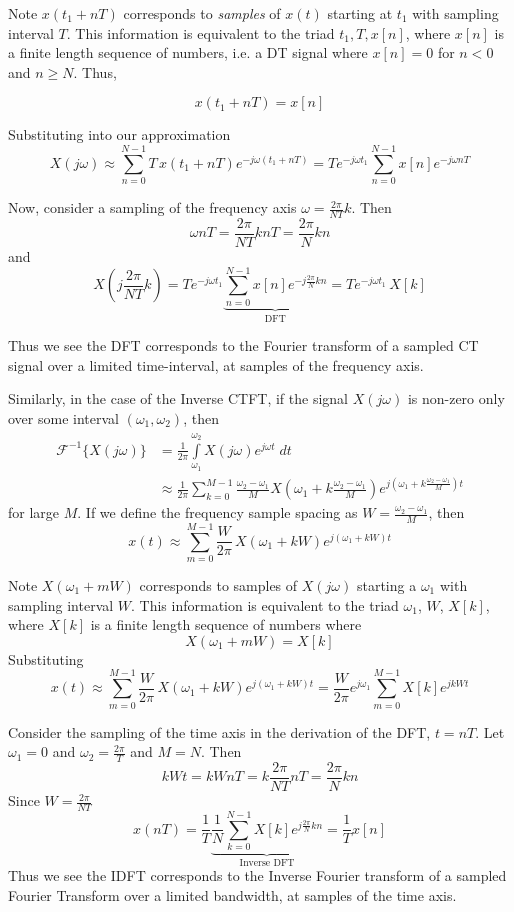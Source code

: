 Note $x\left(t_1 + nT\right)$ corresponds to \emph{samples} of $x(t)$ starting at $t_1$ with sampling interval $T$. This information is equivalent to the triad $t_1, T, x[n]$, where $x[n]$ is a finite length sequence of numbers, i.e. a DT signal where $x[n] = 0$ for $n < 0$ and $n \geq N$. Thus,

\[
x\left(t_1 + nT\right) = x[n]
\]

Substituting into our approximation
\[
X(j\omega) \approx \sum_{n = 0}^{N-1} T \, x\left(t_1 + nT\right) e^{-j\omega \left(t_1 + nT\right)} = T e^{-j\omega t_1} \sum_{n = 0}^{N-1} x[n] e^{-j\omega n T} 
\]

Now, consider a sampling of the frequency axis $\omega = \frac{2\pi}{NT} k$. Then
\[
\omega n T = \frac{2\pi}{N T} k n T = \frac{2\pi}{N}k n
\]
and
\[
X\left(j\frac{2\pi}{NT} k\right) = T e^{-j\omega t_1} \underbrace{\sum_{n = 0}^{N-1} x[n]  e^{-j \frac{2\pi}{N}k n}}_{\text{DFT}} = T e^{-j\omega t_1} \, X[k] 
\]

Thus we see the DFT corresponds to the Fourier transform of a sampled CT signal over a limited time-interval, at samples of the frequency axis.

Similarly, in the case of the Inverse CTFT, if the signal $X(j\omega)$ is non-zero only over some interval $(\omega_1, \omega_2)$, then
\begin{align*}
  \mathcal{F}^{-1}\{ X(j\omega) \} &= \frac{1}{2\pi} \int\limits_{\omega_1}^{\omega_2} X(j\omega) e^{j\omega t} \; dt\\ &\approx \frac{1}{2\pi} \sum_{k = 0}^{M-1} \frac{\omega_2-\omega_1}{M} X\left(\omega_1 + k\frac{\omega_2-\omega_1}{M}\right) e^{j \left(\omega_1 + k\frac{\omega_2-\omega_1}{M}\right)t} 
\end{align*}
for large $M$. If we define the frequency sample spacing as $W = \frac{\omega_2-\omega_1}{M}$, then
\[
x(t) \approx \sum_{m = 0}^{M-1} \frac{W}{2\pi}  \, X\left(\omega_1 + kW\right) e^{j\left(\omega_1 + kW\right)t}
\]

Note $X\left(\omega_1 + mW\right)$ corresponds to samples of $X(j\omega)$ starting a $\omega_1$ with sampling interval $W$. This information is equivalent to the triad $\omega_1$, $W$, $X[k]$, where $X[k]$ is a finite length sequence of numbers where 
\[
X\left(\omega_1 + mW\right) = X[k]
\]
Substituting 
\[
x(t) \approx \sum_{m = 0}^{M-1} \frac{W}{2\pi}  \, X\left(\omega_1 + kW\right) e^{j\left(\omega_1 + kW\right)t} = \frac{W}{2\pi} e^{j\omega_1} \sum_{m = 0}^{M-1}  X[k] e^{j kWt} 
\]

Consider the sampling of the time axis in the derivation of the DFT, $t = nT$. Let $\omega_1 = 0$ and $\omega_2 = \frac{2\pi}{T}$ and $M = N$. Then
\[
kWt = kWnT = k \frac{2\pi}{NT} n T = \frac{2\pi}{N}kn
\]
Since $W = \frac{2\pi}{NT}$
\[
x(nT) = \frac{1}{T} \underbrace{\frac{1}{N} \sum_{k = 0}^{N-1}  X[k] e^{j \frac{2\pi}{N}k n}}_{\text{Inverse DFT}} = \frac{1}{T} x[n] 
\]
Thus we see the IDFT corresponds to the Inverse Fourier transform of a sampled Fourier Transform over a limited bandwidth, at samples of the time axis.

